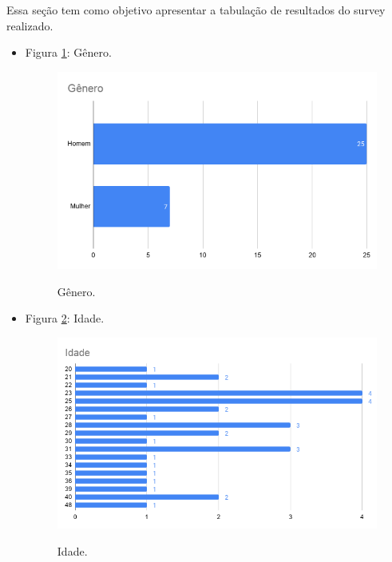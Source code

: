 \label{sec:resultadospesquisa}


Essa seção tem como objetivo apresentar a tabulação de resultados do survey realizado.

\begin{itemize}

    \item Figura \ref{figure:s_genero}: Gênero.
    \begin{figure}[!htb]
    \centering
    \includegraphics[width=.70\textwidth]{images/s_genero.png}
    \label{figure:s_genero}
    \caption{Gênero.}
    \end{figure}
    
    
    \item Figura \ref{figure:s_idade}: Idade.
    \begin{figure}[!htb]
    \centering
    \includegraphics[width=.90\textwidth]{images/s_idade.png}
    \label{figure:s_idade}
    \caption{Idade.}
    \end{figure}
    

\end{itemize}
